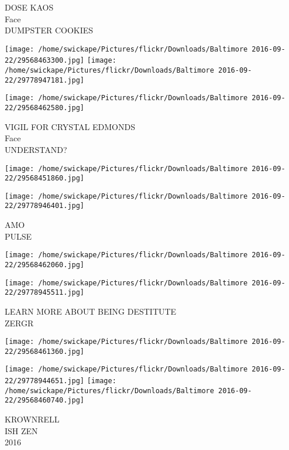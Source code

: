 \documentclass[10pt,letterpaper]{article}
\begin{document}
DOSE KAOS\\
Face\\
DUMPSTER COOKIES\\
\pagebreak

\texttt{[image: /home/swickape/Pictures/flickr/Downloads/Baltimore 2016-09-22/29568463300.jpg]}
\texttt{[image: /home/swickape/Pictures/flickr/Downloads/Baltimore 2016-09-22/29778947181.jpg]}

\vspace{0.25in}
\texttt{[image: /home/swickape/Pictures/flickr/Downloads/Baltimore 2016-09-22/29568462580.jpg]}

VIGIL FOR CRYSTAL EDMONDS\\
Face\\
UNDERSTAND?\\
\pagebreak

\texttt{[image: /home/swickape/Pictures/flickr/Downloads/Baltimore 2016-09-22/29568451860.jpg]}

\vspace{0.25in}
\texttt{[image: /home/swickape/Pictures/flickr/Downloads/Baltimore 2016-09-22/29778946401.jpg]}

AMO\\
PULSE\\
\pagebreak

\texttt{[image: /home/swickape/Pictures/flickr/Downloads/Baltimore 2016-09-22/29568462060.jpg]}

\vspace{0.25in}
\texttt{[image: /home/swickape/Pictures/flickr/Downloads/Baltimore 2016-09-22/29778945511.jpg]}

LEARN MORE ABOUT BEING DESTITUTE\\
ZERGR\\
\pagebreak

\texttt{[image: /home/swickape/Pictures/flickr/Downloads/Baltimore 2016-09-22/29568461360.jpg]}

\vspace{0.25in}
\texttt{[image: /home/swickape/Pictures/flickr/Downloads/Baltimore 2016-09-22/29778944651.jpg]}
\texttt{[image: /home/swickape/Pictures/flickr/Downloads/Baltimore 2016-09-22/29568460740.jpg]}

KROWNRELL\\
ISH ZEN\\
2016\\
\pagebreak
\end{document}
